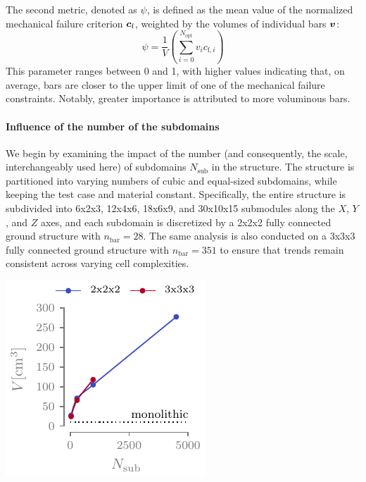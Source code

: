 The second metric, denoted as $\psi$, is defined as the mean value of the normalized mechanical failure criterion $\bm{c}_\text{f}$, weighted by the volumes of individual bars $\bm{v}$:
\begin{equation}
    \psi = \frac{1}{V} \left( \sum_{i=0}^{N_\text{opt}} v_i c_{\text{f},i} \right)
\end{equation}
This parameter ranges between 0 and 1, with higher values indicating that, on average, bars are closer to the upper limit of one of the mechanical failure constraints. Notably, greater importance is attributed to more voluminous bars.

\paragraph{Influence of the number of the subdomains}
We begin by examining the impact of the number (and consequently, the scale, interchangeably used here) of subdomains $N_\text{sub}$ in the structure. The structure is partitioned into varying numbers of cubic and equal-sized subdomains, while keeping the test case and material constant. Specifically, the entire structure is subdivided into 6x2x3, 12x4x6, 18x6x9, and 30x10x15 submodules along the $X$, $Y$, and $Z$ axes, and each subdomain is discretized by a 2x2x2 fully connected ground structure with $n_{\text{bar}} = 28$. The same analysis is also conducted on a 3x3x3 fully connected ground structure with $n_{\text{bar}} = 351$ to ensure that trends remain consistent across varying cell complexities.

\begin{marginfigure}
    \centering
    \includegraphics{figures/05_cellular_opt/00_module_scale_tab/scale_tab_v.pdf}
    \caption{}
    \label{fig:05_scale_v}
\end{marginfigure}

